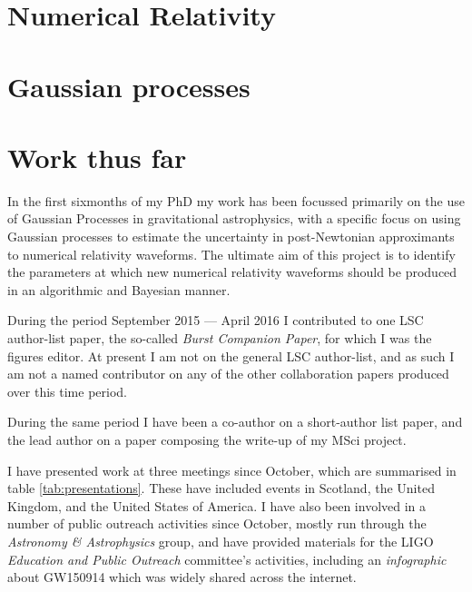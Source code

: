 \documentclass{kentigern}
\begin{document}
\section{Numerical Relativity}
\label{sec:numerical-relativity}



\section{Gaussian processes}
\label{sec:gaussian-process}




\section{Work thus far}

In the first sixmonths of my PhD my work has been focussed primarily
on the use of Gaussian Processes in gravitational astrophysics, with a
specific focus on using Gaussian processes to estimate the uncertainty
in post-Newtonian approximants to numerical relativity waveforms. The
ultimate aim of this project is to identify the parameters at which
new numerical relativity waveforms should be produced in an
algorithmic and Bayesian manner.

During the period September 2015 --- April 2016 I contributed to one
LSC author-list paper, the so-called \emph{Burst Companion Paper}, for
which I was the figures editor. At present I am not on the general LSC
author-list, and as such I am not a named contributor on any of the
other collaboration papers produced over this time period.

During the same period I have been a co-author on a short-author list
paper, and the lead author on a paper composing the write-up of my
MSci project.

I have presented work at three meetings since October, which are
summarised in table \ref{tab:presentations}. These have included
events in Scotland, the United Kingdom, and the United States of
America. I have also been involved in a number of public outreach
activities since October, mostly run through the \emph{Astronomy \&
  Astrophysics} group, and have provided materials for the LIGO
\emph{Education and Public Outreach} committee's activities, including
an \emph{infographic} about GW150914 which was widely shared across
the internet.
\end{document}
